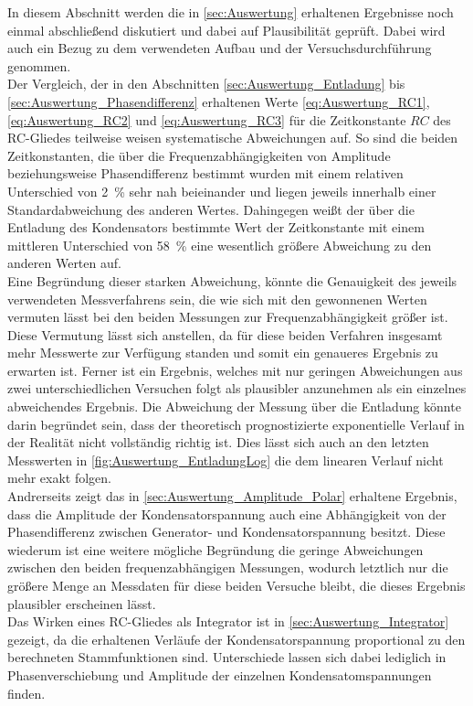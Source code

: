 In diesem Abschnitt werden die in \cref{sec:Auswertung} erhaltenen Ergebnisse
noch einmal abschließend diskutiert und dabei auf Plausibilität geprüft.
Dabei wird auch ein Bezug zu dem verwendeten Aufbau und der Versuchsdurchführung genommen.\\

Der Vergleich, der in den Abschnitten \ref{sec:Auswertung_Entladung} bis \ref{sec:Auswertung_Phasendifferenz}
erhaltenen Werte \cref{eq:Auswertung_RC1}, \cref{eq:Auswertung_RC2} und \cref{eq:Auswertung_RC3} 
für die Zeitkonstante $RC$ des RC-Gliedes teilweise weisen systematische Abweichungen auf.
So sind die beiden Zeitkonstanten, die über die Frequenzabhängigkeiten von Amplitude beziehungsweise
Phasendifferenz bestimmt wurden mit einem relativen Unterschied von \SI{2}{\percent} sehr nah beieinander
und liegen jeweils innerhalb einer Standardabweichung des anderen Wertes. 
Dahingegen weißt der über die Entladung des Kondensators bestimmte Wert der Zeitkonstante mit einem
mittleren Unterschied von \SI{58}{\percent} eine wesentlich größere Abweichung zu den anderen Werten
auf.\\
Eine Begründung dieser starken Abweichung, könnte die Genauigkeit des jeweils verwendeten Messverfahrens
sein, die wie sich mit den gewonnenen Werten vermuten lässt bei den beiden Messungen zur 
Frequenzabhängigkeit größer ist.  Diese Vermutung lässt sich anstellen, da für diese beiden Verfahren 
insgesamt mehr Messwerte zur Verfügung standen und somit ein genaueres Ergebnis zu erwarten 
ist. Ferner ist ein Ergebnis, welches mit nur geringen Abweichungen aus zwei unterschiedlichen Versuchen 
folgt als plausibler anzunehmen als ein einzelnes abweichendes Ergebnis.
Die Abweichung der Messung über die Entladung könnte darin begründet sein, dass der theoretisch 
prognostizierte exponentielle Verlauf in der Realität nicht vollständig richtig ist. Dies 
lässt sich auch an den letzten Messwerten in \cref{fig:Auswertung_EntladungLog} die dem linearen Verlauf 
nicht mehr exakt folgen.\\
Andrerseits zeigt das in \cref{sec:Auswertung_Amplitude_Polar} erhaltene Ergebnis, dass die Amplitude 
der Kondensatorspannung auch eine Abhängigkeit von der Phasendifferenz zwischen Generator- und 
Kondensatorspannung besitzt. Diese wiederum ist eine weitere mögliche Begründung die geringe Abweichungen
zwischen den beiden frequenzabhängigen Messungen, wodurch letztlich nur die größere Menge an Messdaten 
für diese beiden Versuche bleibt, die dieses Ergebnis plausibler erscheinen lässt.\\

Das Wirken eines RC-Gliedes als Integrator ist in \cref{sec:Auswertung_Integrator} gezeigt,
da die erhaltenen Verläufe der Kondensatorspannung proportional zu den berechneten Stammfunktionen  
sind. Unterschiede lassen sich dabei lediglich in Phasenverschiebung und Amplitude der einzelnen 
Kondensatomspannungen finden.
